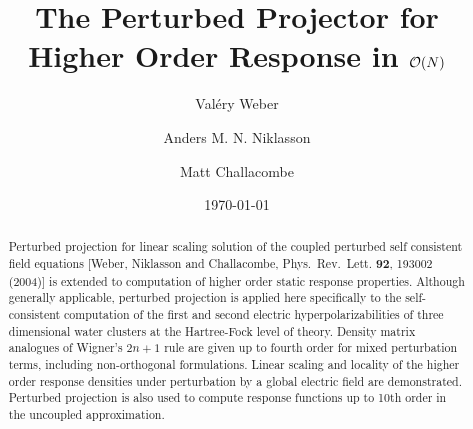 \documentclass[prl,aps,letterpaper,twocolumn,showpacs,twocolumngrid,superbib]{revtex4}
\begin{document}
\title{The Perturbed Projector for Higher Order Response in ${\cal O}(N)$} 

\author{Val\'ery Weber}
\author{Anders M. N. Niklasson}
\author{Matt Challacombe}

\date{\today}

\begin{abstract}
Perturbed projection  for linear scaling solution of the coupled perturbed 
self consistent field equations 
[Weber, Niklasson and  Challacombe, Phys.\ Rev.\ Lett. {\bf 92}, 193002 (2004)] 
is extended to computation of higher order static response properties.
Although generally applicable, perturbed projection is applied here specifically to the 
self-consistent computation of the first and second electric hyperpolarizabilities 
of three dimensional water clusters at the Hartree-Fock level of theory. 
Density matrix analogues of Wigner's $2n+1$ rule are given up to fourth order for 
mixed perturbation terms, including non-orthogonal formulations.
Linear scaling and locality of the higher order response densities under perturbation 
by a global electric field are demonstrated.  Perturbed projection is also used to compute 
response functions up to 10th order in the uncoupled approximation.  
\end{abstract}

\maketitle


\newpage
\end{document}
